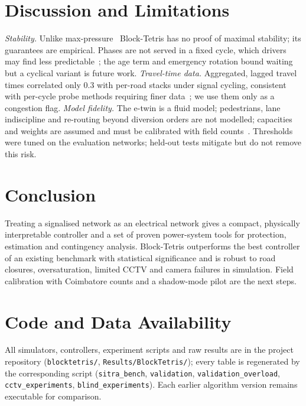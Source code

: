 \documentclass[journal]{IEEEtran}
\begin{document}
\section{Discussion and Limitations}
\emph{Stability.} Unlike max-pressure~\cite{varaiya2013maxpressure} Block-Tetris has no
proof of maximal stability; its guarantees are empirical. Phases are not served in a fixed
cycle, which drivers may find less predictable~\cite{levin2020cyclical}; the age term and
emergency rotation bound waiting but a cyclical variant is future work.
\emph{Travel-time data.} Aggregated, lagged travel times correlated only 0.3 with
per-road stacks under signal cycling, consistent with per-cycle probe methods requiring
finer data~\cite{ban2011queue,mercader2020traveltime}; we use them only as a congestion flag.
\emph{Model fidelity.} The e-twin is a fluid model; pedestrians, lane indiscipline and
re-routing beyond diversion orders are not modelled; capacities and weights are assumed and
must be calibrated with field counts~\cite{indohcm2017}. Thresholds were tuned on the
evaluation networks; held-out tests mitigate but do not remove this risk.

\section{Conclusion}
Treating a signalised network as an electrical network gives a compact, physically
interpretable controller and a set of proven power-system tools for protection, estimation
and contingency analysis. Block-Tetris outperforms the best controller of an existing
benchmark with statistical significance and is robust to road closures, oversaturation,
limited CCTV and camera failures in simulation. Field calibration with Coimbatore counts and
a shadow-mode pilot are the next steps.

\section*{Code and Data Availability}
All simulators, controllers, experiment scripts and raw results are in the
project repository (\texttt{blocktetris/}, \texttt{Results/BlockTetris/});
every table is regenerated by the corresponding script
(\texttt{sitra\_bench}, \texttt{validation}, \texttt{validation\_overload},
\texttt{cctv\_experiments}, \texttt{blind\_experiments}). Each earlier
algorithm version remains executable for comparison.



\end{document}
